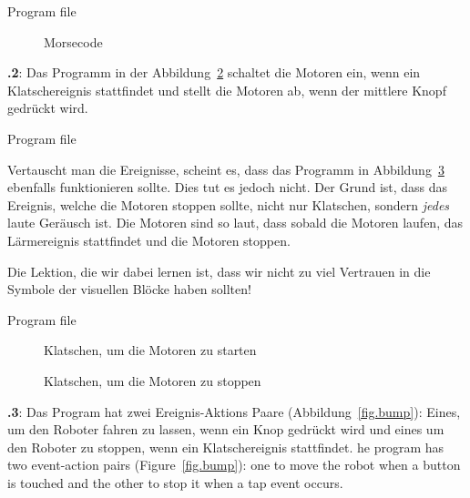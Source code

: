 \documentclass[12pt,a4paper,english]{article}
\begin{document}
{\raggedleft \hfill Program file }

\begin{figure}
\begin{center}
\caption{Morsecode}\label{fig.morse}
\end{center}
\end{figure}


\textbf{\thesection.2}: 
Das Programm in der Abbildung~\ref{fig.clap-to-start} schaltet die Motoren ein, wenn ein Klatschereignis stattfindet und stellt die Motoren ab, wenn der mittlere Knopf gedrückt wird.


{\raggedleft \hfill Program file }

Vertauscht man die Ereignisse, scheint es, dass das Programm in Abbildung~\ref{fig.clap-to-stop}  ebenfalls funktionieren sollte. Dies tut es jedoch nicht. Der Grund ist, dass das Ereignis, welche die Motoren stoppen sollte, nicht nur Klatschen, sondern \emph{jedes} laute Geräusch ist. Die Motoren sind so laut, dass sobald die Motoren laufen, das Lärmereignis stattfindet und die Motoren stoppen. 

Die Lektion, die wir dabei lernen ist, dass wir nicht zu viel Vertrauen in die Symbole der visuellen Blöcke haben sollten!

{\raggedleft \hfill Program file }

\begin{figure}
\begin{center}
\caption{Klatschen, um die Motoren zu starten}\label{fig.clap-to-start}
\end{center}
\end{figure}

\begin{figure}[hbt]
\begin{center}
\caption{Klatschen, um die Motoren zu stoppen}\label{fig.clap-to-stop}
\end{center}
\end{figure}

\textbf{\thesection.3}:
Das Program hat zwei Ereignis-Aktions Paare (Abbildung~\ref{fig.bump}): Eines, um den Roboter fahren zu lassen, wenn ein Knop gedrückt wird und eines um den Roboter zu stoppen, wenn ein Klatschereignis stattfindet.
he program has two event-action pairs (Figure~\ref{fig.bump}): one to
move the robot when a button is touched and the other to stop it when a
tap event occurs.
\end{document}
